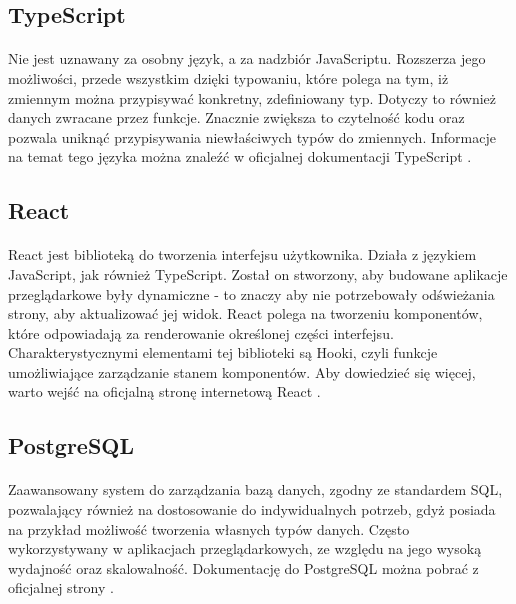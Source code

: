 \subsection{TypeScript}
\paragraph{}
Nie jest uznawany za osobny język, a za nadzbiór JavaScriptu. Rozszerza jego możliwości, przede wszystkim dzięki typowaniu, które polega na tym, iż zmiennym można przypisywać konkretny, zdefiniowany typ. Dotyczy to również danych zwracane przez funkcje. Znacznie zwiększa to czytelność kodu oraz pozwala uniknąć przypisywania niewłaściwych typów do zmiennych. Informacje na temat tego języka można znaleźć w oficjalnej dokumentacji TypeScript \cite{bib:typescript}.

\subsection{React}
\paragraph{}
React jest biblioteką do tworzenia interfejsu użytkownika. Działa z językiem JavaScript, jak również TypeScript. Został on stworzony, aby budowane aplikacje przeglądarkowe były dynamiczne - to znaczy aby nie potrzebowały odświeżania strony, aby aktualizować jej widok. React polega na tworzeniu komponentów, które odpowiadają za renderowanie określonej części interfejsu. Charakterystycznymi elementami tej biblioteki są Hooki, czyli funkcje umożliwiające zarządzanie stanem komponentów. Aby dowiedzieć się więcej, warto wejść na oficjalną stronę internetową React \cite{bib:react}.

\subsection{PostgreSQL}
\paragraph{}
Zaawansowany system do zarządzania bazą danych, zgodny ze standardem SQL, pozwalający również na dostosowanie do indywidualnych potrzeb, gdyż posiada na przykład możliwość tworzenia własnych typów danych. Często wykorzystywany w aplikacjach przeglądarkowych, ze względu na jego wysoką wydajność oraz skalowalność. Dokumentację do PostgreSQL można pobrać z oficjalnej strony \cite{bib:postgres}.


